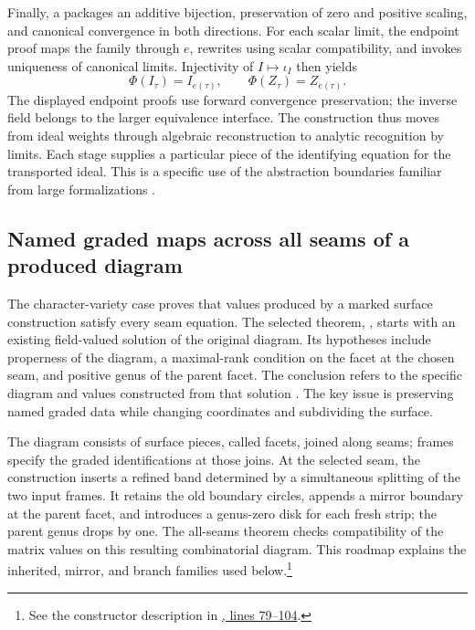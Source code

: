 Finally, a  packages an additive bijection, preservation
of zero and positive scaling, and canonical convergence in both
directions. For each scalar limit, the endpoint proof maps the family
through $e$, rewrites using scalar compatibility, and invokes uniqueness
of canonical limits. Injectivity of $I\mapsto\iota_I$ then yields
\[
  \Phi(I_\tau)=I_{e(\tau)},\qquad
  \Phi(Z_\tau)=Z_{e(\tau)}.
\]
The displayed endpoint proofs use forward convergence preservation;
the inverse field belongs to the larger equivalence interface. The construction thus moves from ideal weights through algebraic reconstruction to analytic recognition by limits. Each stage supplies a particular piece of the identifying equation for the transported ideal. This is a specific use of the
abstraction boundaries familiar from large formalizations
\citep{Perfectoid2020,CommelinTopaz2024}.

\subsection{Named graded maps across all seams of a produced diagram}
\label{sec:all-seams}

The character-variety case proves that values produced by a marked
surface construction satisfy every seam equation. The selected theorem,
, starts with an existing field-valued
solution of the original diagram. Its hypotheses include properness of
the diagram, a maximal-rank condition on the facet at the chosen seam,
and positive genus of the parent facet. The conclusion refers to the
specific diagram and values constructed from that solution
\citep{OAIAllSeams}. The key issue is preserving named graded data while
changing coordinates and subdividing the surface.

The diagram consists of surface pieces, called facets, joined along
seams; frames specify the graded identifications at those joins. At the
selected seam, the construction inserts a refined band determined by a
simultaneous splitting of the two input frames. It retains the old
boundary circles, appends a mirror boundary at the parent facet, and
introduces a genus-zero disk for each fresh strip; the parent genus drops by one.
The all-seams theorem checks compatibility of the matrix values on
this resulting combinatorial diagram. This roadmap explains the
inherited, mirror, and branch families used below.\footnote{See the
constructor description in
\href{https://github.com/openai/math/blob/fd4aeeb2ee4fc729c18d98444fed42fd0529eeeb/lean/OAI/AlgebraicGeometry/CharacterVarieties/Cutting/MarkedDiagram.lean\#L79-L104}{, lines 79--104}.}

